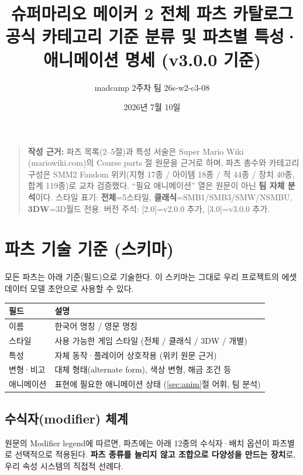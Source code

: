 \documentclass[10pt,a4paper]{article}
\title{슈퍼마리오 메이커 2 전체 파츠 카탈로그\\
\large 공식 카테고리 기준 분류 및 파츠별 특성·애니메이션 명세 (v3.0.0 기준)}
\author{madcamp 2주차 팀 26s-w2-c3-08}
\date{2026년 7월 10일}
\begin{document}
\maketitle

\begin{quote}\small
\textbf{작성 근거:} 파츠 목록(2--5절)과 특성 서술은 Super Mario Wiki
(mariowiki.com)의 Course parts 절 원문을 근거로 하며, 파츠 총수와 카테고리
구성은 SMM2 Fandom 위키(지형 17종 / 아이템 18종 / 적 44종 / 장치 40종,
합계 119종)로 교차 검증했다. ``필요 애니메이션'' 열은 원문이 아닌
\textbf{팀 자체 분석}이다. 스타일 표기: \textbf{전체}=5스타일,
\textbf{클래식}=SMB1/SMB3/SMW/NSMBU, \textbf{3DW}=3D월드 전용.
버전 주석: [2.0]=v2.0.0 추가, [3.0]=v3.0.0 추가.
\end{quote}

\tableofcontents
\newpage

\section{파츠 기술 기준 (스키마)}

모든 파츠는 아래 기준(필드)으로 기술한다. 이 스키마는 그대로 우리 프로젝트의
에셋 데이터 모델 초안으로 사용할 수 있다.

\begin{longtable}{L{3cm} L{12.5cm}}
\toprule
\textbf{필드} & \textbf{설명} \\
\midrule
이름 & 한국어 명칭 / 영문 명칭 \\
스타일 & 사용 가능한 게임 스타일 (전체 / 클래식 / 3DW / 개별) \\
특성 & 자체 동작·플레이어 상호작용 (위키 원문 근거) \\
변형·비고 & 대체 형태(alternate form), 색상 변형, 해금 조건 등 \\
애니메이션 & 표현에 필요한 애니메이션 상태 (\ref{sec:anim}절 어휘, 팀 분석) \\
\bottomrule
\end{longtable}

\subsection{수식자(modifier) 체계}\label{sec:mod}

원문의 Modifier legend에 따르면, 파츠에는 아래 12종의 수식자·배치 옵션이
파츠별로 선택적으로 적용된다. \textbf{파츠 종류를 늘리지 않고 조합으로
다양성을 만드는 장치}로, 우리 속성 시스템의 직접적 선례다.
\end{document}
